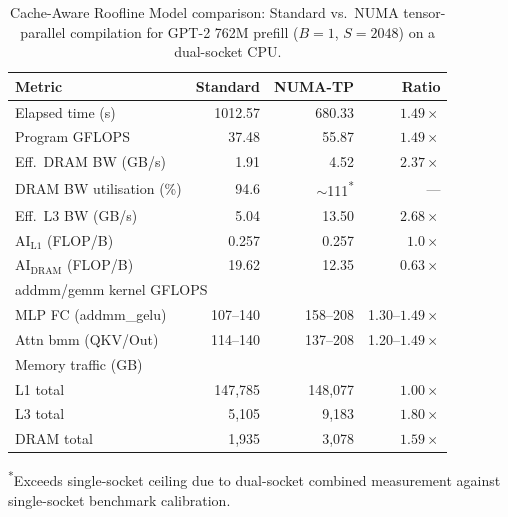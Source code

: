 \begin{table}[t]
  \centering
  \caption{Cache-Aware Roofline Model comparison: Standard vs.\ NUMA
  tensor-parallel compilation for GPT-2 762M prefill ($B{=}1$, $S{=}2048$)
  on a dual-socket CPU.}
  \label{tab:roofline-summary}
  \small
  \begin{tabular}{l r r r}
    \toprule
    \textbf{Metric} & \textbf{Standard} & \textbf{NUMA-TP} & \textbf{Ratio} \\
    \midrule
    Elapsed time (s)           & 1012.57 &  680.33 & $1.49\times$ \\
    Program GFLOPS             &   37.48 &   55.87 & $1.49\times$ \\
    Eff.\ DRAM BW (GB/s)      &    1.91 &    4.52 & $2.37\times$ \\
    DRAM BW utilisation (\%)   &   94.6  & $\sim$111\textsuperscript{*} & --- \\
    Eff.\ L3 BW (GB/s)        &    5.04 &   13.50 & $2.68\times$ \\
    $\text{AI}_{\text{L1}}$ (FLOP/B)  &  0.257  &  0.257  & $1.0\times$ \\
    $\text{AI}_{\text{DRAM}}$ (FLOP/B) & 19.62  &  12.35  & $0.63\times$ \\
    \midrule
    \multicolumn{4}{l}{\footnotesize addmm/gemm kernel GFLOPS} \\
    \quad MLP FC (addmm\_gelu) &  107--140 &  158--208 & 1.30--$1.49\times$ \\
    \quad Attn bmm (QKV/Out)   &  114--140 &  137--208 & 1.20--$1.49\times$ \\
    \midrule
    \multicolumn{4}{l}{\footnotesize Memory traffic (GB)} \\
    \quad L1 total             & 147{,}785 & 148{,}077 & $1.00\times$ \\
    \quad L3 total             &   5{,}105 &   9{,}183 & $1.80\times$ \\
    \quad DRAM total           &   1{,}935 &   3{,}078 & $1.59\times$ \\
    \bottomrule
  \end{tabular}

  \vspace{2pt}
  {\footnotesize \textsuperscript{*}Exceeds single-socket ceiling due to
  dual-socket combined measurement against single-socket benchmark
  calibration.}
\end{table}


